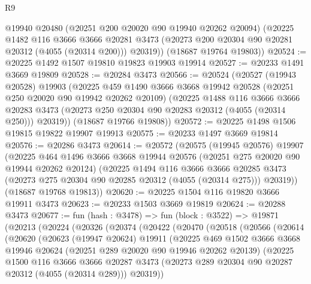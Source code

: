 \begin{lexlean}{R9}
\begin{coremodule}
        @19940
        @20480
        (@20251 @200 @20020 @90 @19940 @20262 @20094)
        (@20225
          @1482
          @116
          @3666
          @3666
          @20281
          @3473
          (@20273 @200 @20304 @90 @20281 @20312 (@4055 (@20314 @200)))
          @20319))
      (@18687 @19764 @19803))
@20524 := @20225 @1492 @1507 @19810 @19823 @19903 @19914
@20527 := @20233 @1491 @3669 @19809
@20528 := @20284 @3473
@20566 := @20524
    (@20527
      (@19943 @20528)
      @19903
      (@20225
        @459
        @1490
        @3666
        @3668
        @19942
        @20528
        (@20251 @250 @20020 @90 @19942 @20262 @20109)
        (@20225
          @1488
          @116
          @3666
          @3666
          @20283
          @3473
          (@20273 @250 @20304 @90 @20283 @20312 (@4055 (@20314 @250)))
          @20319))
      (@18687 @19766 @19808))
@20572 := @20225 @1498 @1506 @19815 @19822 @19907 @19913
@20575 := @20233 @1497 @3669 @19814
@20576 := @20286 @3473
@20614 := @20572
    (@20575
      (@19945 @20576)
      @19907
      (@20225
        @464
        @1496
        @3666
        @3668
        @19944
        @20576
        (@20251 @275 @20020 @90 @19944 @20262 @20124)
        (@20225
          @1494
          @116
          @3666
          @3666
          @20285
          @3473
          (@20273 @275 @20304 @90 @20285 @20312 (@4055 (@20314 @275)))
          @20319))
      (@18687 @19768 @19813))
@20620 := @20225 @1504 @116 @19820 @3666 @19911 @3473
@20623 := @20233 @1503 @3669 @19819
@20624 := @20288 @3473
@20677 := fun (hash : @3478) =>
  fun (block : @3522) =>
  @19871
    (@20213
      (@20224
        (@20326
          (@20374
            (@20422
              (@20470
                (@20518
                  (@20566
                    (@20614
                      (@20620
                        (@20623
                          (@19947 @20624)
                          @19911
                          (@20225
                            @469
                            @1502
                            @3666
                            @3668
                            @19946
                            @20624
                            (@20251 @289 @20020 @90 @19946 @20262 @20139)
                            (@20225
                              @1500
                              @116
                              @3666
                              @3666
                              @20287
                              @3473
                              (@20273 @289 @20304 @90 @20287 @20312 (@4055 (@20314 @289)))
                              @20319))

\end{coremodule}
\end{lexlean}
